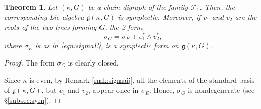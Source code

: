 \documentclass[a4paper,11pt]{amsart}
\newtheorem{theorem}{Theorem}[section]
\theoremstyle{definition}
\theoremstyle{remark}
\numberwithin{equation}{section}
\newcommand{\g}{\mathfrak{g}}
\newcommand{\F}{\mathcal{F}}
\begin{document}
\begin{theorem}
Let $(\kappa,G)$ be a chain digraph of the family $\F_1$. 
Then, the corresponding Lie algebra $\g(\kappa,G)$ is symplectic.
Moreover, if $v_1$ and $v_2$ are the roots of the two trees forming $G$,
the 2-form
\[ \sigma_G= \sigma_E + v_1^*\wedge v_2^*, \]
where $\sigma_E$ is as in \eqref{eqn:sigmaE}, is a symplectic form on $\g(\kappa,G)$.
\end{theorem}

\begin{proof}
The form $\sigma_G$ is clearly closed.

Since $\kappa$ is even, by Remark \ref{rmk:sigmaij}, all the elements of the standard basis of $\g(\kappa,G)$, but $v_1$ and $v_2$, appear once in $\sigma_E$.
Hence, $\sigma_G$ is nondegenerate (see \S \ref{subsec:sym}).
\end{proof}
\end{document}
